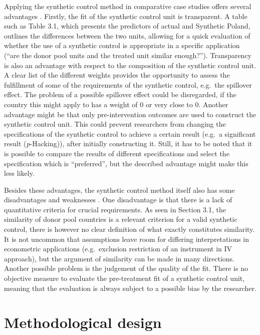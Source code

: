 \documentclass{scrbook}
\begin{document}
Applying the synthetic control method in comparative case studies offers
several advantages \parencite{abadie_using_2021}. Firstly, the fit of
the synthetic control unit is transparent. A table such as Table 3.1,
which presents the predictors of actual and Synthetic Poland, outlines
the differences between the two units, allowing for a quick evaluation
of whether the use of a synthetic control is appropriate in a specific
application (``are the donor pool units and the treated unit similar
enough?''). Transparency is also an advantage with respect to the
composition of the synthetic control unit. A clear list of the different
weights provides the opportunity to assess the fulfillment of some of
the requirements of the synthetic control, e.g.~the spillover effect.
The problem of a possible spillover effect could be disregarded, if the
country this might apply to has a weight of 0 or very close to 0.
Another advantage might be that only pre-intervention outcomes are used
to construct the synthetic control unit. This could prevent researchers
from changing the specifications of the synthetic control to achieve a
certain result (e.g.~a significant result (\textit{p}-Hacking)), after
initially constructing it. Still, it has to be noted that it is possible
to compare the results of different specifications and select the
specification which is ``preferred'', but the described advantage might
make this less likely.

Besides these advantages, the synthetic control method itself also has
some disadvantages and weaknesses \parencite{bouttell_synthetic_2018}.
One disadvantage is that there is a lack of quantitative criteria for
crucial requirements. As seen in Section 3.1, the similarity of donor
pool countries is a relevant criterion for a valid synthetic control,
there is however no clear definition of what exactly constitutes
similarity. It is not uncommon that assumptions leave room for differing
interpretations in econometric applications (e.g.~exclusion restriction
of an instrument in IV approach), but the argument of similarity can be
made in many directions. Another possible problem is the judgement of
the quality of the fit. There is no objective measure to evaluate the
pre-treatment fit of a synthetic control unit, meaning that the
evaluation is always subject to a possible bias by the researcher.

\section{Methodological design}
\end{document}
